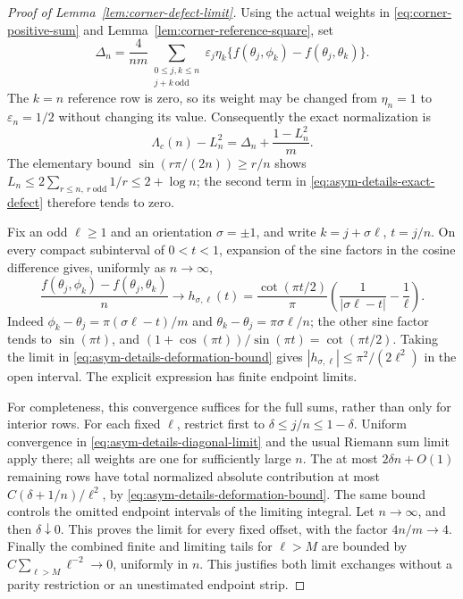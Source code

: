 \begin{proof}[Proof of Lemma~\ref{lem:corner-defect-limit}]
Using the actual weights in \eqref{eq:corner-positive-sum} and
Lemma~\ref{lem:corner-reference-square}, set
\[
 \Delta_n=\frac4{nm}
 \sum_{\substack{0\leq j,k\leq n\\j+k\ \mathrm{odd}}}
 \varepsilon_j\eta_k
      \{f(\theta_j,\phi_k)-f(\theta_j,\theta_k)\}.
\]
The $k=n$ reference row is zero, so its weight may be changed from
$\eta_n=1$ to $\varepsilon_n=1/2$ without changing its value.
Consequently the exact normalization is
\begin{equation}\label{eq:asym-details-exact-defect}
 \Lambda_c(n)-L_n^2=\Delta_n+\frac{1-L_n^2}{m}.
\end{equation}
The elementary bound $\sin(r\pi/(2n))\geq r/n$ shows
$L_n\leq2\sum_{r\leq n,\ r\ \mathrm{odd}}1/r\leq2+\log n$;
the second term in \eqref{eq:asym-details-exact-defect} therefore
tends to zero.

Fix an odd $\ell\geq1$ and an orientation $\sigma=\pm1$, and
write $k=j+\sigma\ell$, $t=j/n$.  On every compact subinterval
of $0<t<1$, expansion of the sine factors in the cosine difference
gives, uniformly as $n\to\infty$,
\begin{equation}\label{eq:asym-details-diagonal-limit}
 \frac{f(\theta_j,\phi_k)-f(\theta_j,\theta_k)}{n}
 \longrightarrow h_{\sigma,\ell}(t)
 =\frac{\cot(\pi t/2)}\pi
       \left(\frac1{|\sigma\ell-t|}-\frac1\ell\right).
\end{equation}
Indeed $\phi_k-\theta_j=\pi(\sigma\ell-t)/m$ and
$\theta_k-\theta_j=\pi\sigma\ell/n$; the other sine factor
tends to $\sin(\pi t)$, and
$(1+\cos(\pi t))/\sin(\pi t)=\cot(\pi t/2)$.
Taking the limit in
\eqref{eq:asym-details-deformation-bound} gives
$|h_{\sigma,\ell}|\leq\pi^2/(2\ell^2)$ in the open interval.
The explicit expression has finite endpoint limits.

For completeness, this convergence suffices for the full sums, rather
than only for interior rows.  For each fixed $\ell$, restrict first
to $\delta\leq j/n\leq1-\delta$.  Uniform convergence in
\eqref{eq:asym-details-diagonal-limit} and the usual Riemann sum
limit apply there; all weights are one for sufficiently large $n$.
The at most $2\delta n+O(1)$ remaining rows have total normalized
absolute contribution at most $C(\delta+1/n)/\ell^2$, by
\eqref{eq:asym-details-deformation-bound}.  The same bound controls
the omitted endpoint intervals of the limiting integral.  Let
$n\to\infty$, and then $\delta\downarrow0$.  This proves the
limit for every fixed offset, with the factor $4n/m\to4$.
Finally the combined finite and limiting tails for $\ell>M$ are
bounded by $C\sum_{\ell>M}\ell^{-2}\to0$, uniformly in $n$.
This justifies both limit exchanges without a parity restriction or
an unestimated endpoint strip.


\end{proof}
